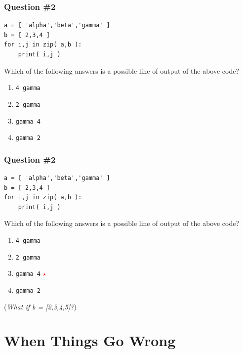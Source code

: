 \documentclass[11pt]{beamer}
\newcommand{\correctstar}{\textcolor{red}{$\star$}}
\begin{document}
\begin{frame}[fragile]
  \frametitle{Question \#2}
  \Enlarge

  \begin{Verbatim}
a = [ 'alpha','beta','gamma' ]
b = [ 2,3,4 ]
for i,j in zip( a,b ):
    print( i,j )
  \end{Verbatim}

  Which of the following answers is a possible line of output of the above code?

  \begin{enumerate}[label=\Alph*]
  \item  \texttt{4 gamma}
  \item  \texttt{2 gamma}
  \item  \texttt{gamma 4}
  \item  \texttt{gamma 2}
  \end{enumerate}
\end{frame}

\begin{frame}[fragile]
  \frametitle{Question \#2}
  \Enlarge

  \begin{Verbatim}
a = [ 'alpha','beta','gamma' ]
b = [ 2,3,4 ]
for i,j in zip( a,b ):
    print( i,j )
  \end{Verbatim}

  Which of the following answers is a possible line of output of the above code?

  \begin{enumerate}[label=\Alph*]
  \item  \texttt{4 gamma}
  \item  \texttt{2 gamma}
  \item  \texttt{gamma 4}  \correctstar
  \item  \texttt{gamma 2}
  \end{enumerate}
  
   (\emph{What if b =  [2,3,4,5]?})
\end{frame}

\section{When Things Go Wrong}
\end{document}
